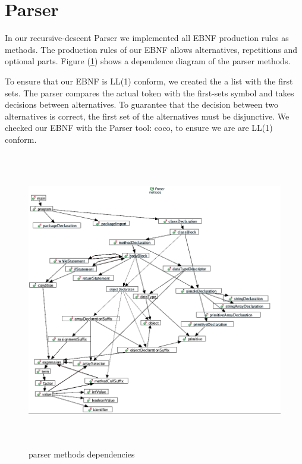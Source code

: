 \section{Parser}

In our recursive-descent Parser we implemented all EBNF production rules as
methods. The production rules of our EBNF allows alternatives, repetitions and optional parts.
Figure (\ref{parser_deb}) shows a dependence diagram of the parser methods.  

To ensure that our EBNF is LL(1) conform, we created the a list with the first sets.
The parser compares the actual token with the first-sets symbol
and takes decisions between alternatives. 
To guarantee that the decision between two alternatives is correct, the first
set of the alternatives must be disjunctive. We checked our EBNF with the Parser tool: coco, to ensure we are are LL(1) conform.

\begin{figure}[h]
\label{parser_deb}
\begin{center}
\includegraphics[width=13cm,height=13cm]{images/parser_edit.png}
\end{center}
\caption{parser methods dependencies}
\end{figure}


